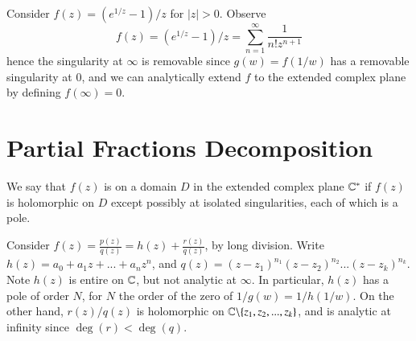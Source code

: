 \begin{example}
    Consider $f(z) = (e^{1/z}-1)/z$ for $|z| > 0$. Observe \begin{equation*}
        f(z) = (e^{1/z}-1)/z = \sum_{n=1}^{\infty}\frac{1}{n!z^{n+1}}
    \end{equation*}
    hence the singularity at $\infty$ is removable since $g(w) = f(1/w)$ has a removable singularity at $0$, and we can analytically extend $f$ to the extended complex plane by defining $f(\infty) = 0$.
\end{example}



\section{Partial Fractions Decomposition}

\begin{definition}
    We say that $f(z)$ is  on a domain $D$ in the extended complex plane $\mathbb C^*$ if $f(z)$ is holomorphic on $D$ except possibly at isolated singularities, each of which is a pole.
\end{definition}

\begin{example}
    Consider $f(z) = \frac{p(z)}{q(z)} = h(z)+\frac{r(z)}{q(z)}$, by long division. Write $h(z) = a_0+a_1z+...+a_nz^n$, and $q(z) = (z-z_1)^{n_1}(z-z_2)^{n_2}...(z-z_k)^{n_k}$. Note $h(z)$ is entire on $\mathbb C$, but not analytic at $\infty$. In particular, $h(z)$ has a pole of order $N$, for $N$ the order of the zero of $1/g(w) = 1/h(1/w)$. On the other hand, $r(z)/q(z)$ is holomorphic on $\mathbb C\backslash\{z_1,z_2,...,z_k\}$, and is analytic at infinity since $\deg(r) < \deg(q)$.
\end{example}

